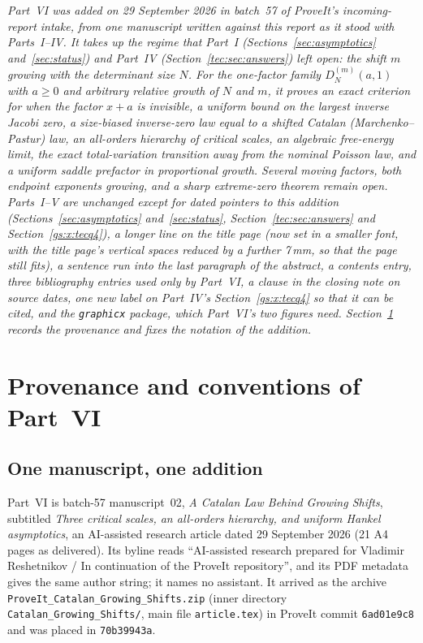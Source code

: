 \documentclass[11pt,a4paper]{article}
\numberwithin{equation}{section}
\theoremstyle{definition}
\theoremstyle{remark}
\begin{document}
\noindent\emph{Part~VI was added on 29 September 2026 in batch~57 of
ProveIt's incoming-report intake, from one manuscript written against this
report as it stood with Parts~I--IV.  It takes up the regime that Part~I
(Sections~\ref{sec:asymptotics} and~\ref{sec:status}) and Part~IV
(Section~\ref{tec:sec:answers}) left open: the shift $m$ growing with the
determinant size $N$.  For the one-factor family $D_N^{(m)}(a,1)$ with
$a\ge0$ and arbitrary relative growth of $N$ and $m$, it proves an exact
criterion for when the factor $x+a$ is invisible, a uniform bound on the
largest inverse Jacobi zero, a size-biased inverse-zero law equal to a
shifted Catalan (Marchenko--Pastur) law, an all-orders hierarchy of
critical scales, an algebraic free-energy limit, the exact total-variation
transition away from the nominal Poisson law, and a uniform saddle prefactor
in proportional growth.  Several moving factors, both endpoint exponents
growing, and a sharp extreme-zero theorem remain open.  Parts~I--V are
unchanged except for dated pointers to this addition (Sections~\ref{sec:asymptotics}
and~\ref{sec:status}, Section~\ref{tec:sec:answers} and
Section~\ref{gs:x:tecq4}), a longer line on the title page (now set in a
smaller font, with the title page's vertical spaces reduced by a
further 7\,mm, so that the page still fits), a sentence run into the last
paragraph of the abstract, a contents entry, three bibliography entries
used only by
Part~VI, a clause in the closing note on source dates, one new label on
Part~IV's Section~\ref{gs:x:tecq4} so that it can be cited, and the
\texttt{graphicx} package, which Part~VI's two figures need.
Section~\ref{gs:sec:intro} records the provenance and fixes the notation
of the addition.}

\section{Provenance and conventions of Part~VI}\label{gs:sec:intro}

\subsection{One manuscript, one addition}\label{gs:sec:source}
Part~VI is batch-57 manuscript~02, \emph{A Catalan Law Behind Growing
Shifts}, subtitled \emph{Three critical scales, an all-orders hierarchy, and
uniform Hankel asymptotics}, an AI-assisted research article dated
29 September 2026 (21 A4 pages as delivered).  Its byline reads
``AI-assisted research prepared for Vladimir Reshetnikov / In continuation
of the ProveIt repository'', and its PDF metadata gives the same author
string; it names no assistant.  It arrived as the archive
\nolinkurl{ProveIt_Catalan_Growing_Shifts.zip} (inner directory
\nolinkurl{Catalan_Growing_Shifts/}, main file \nolinkurl{article.tex}) in
ProveIt commit \texttt{6ad01e9c8} and was placed in \texttt{70b39943a}.
\end{document}
